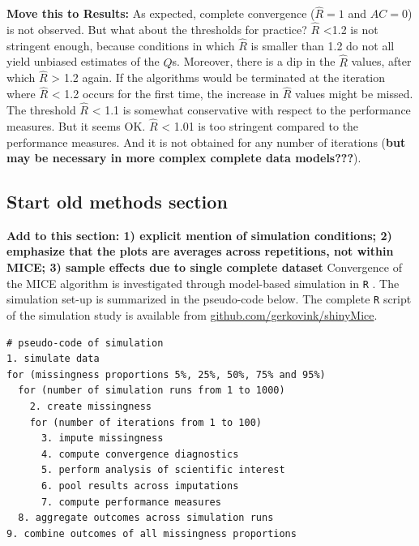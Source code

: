 \documentclass[Royal,times,sageh]{sagej}
\begin{document}
\textbf{Move this to Results:} As expected, complete convergence
(\(\widehat{R}=1\) and \(AC=0\)) is not observed. But what about the
thresholds for practice? \(\widehat{R}\) \textless1.2 is not stringent
enough, because conditions in which \(\widehat{R}\) is smaller than 1.2
do not all yield unbiased estimates of the \(Q\)s. Moreover, there is a
dip in the \(\widehat{R}\) values, after which \(\widehat{R}\)
\textgreater{} 1.2 again. If the algorithms would be terminated at the
iteration where \(\widehat{R}\) \textless{} 1.2 occurs for the first
time, the increase in \(\widehat{R}\) values might be missed. The
threshold \(\widehat{R}\) \textless{} 1.1 is somewhat conservative with
respect to the performance measures. But it seems OK. \(\widehat{R}\)
\textless{} 1.01 is too stringent compared to the performance measures.
And it is not obtained for any number of iterations (\textbf{but may be
necessary in more complex complete data models???}).

\hypertarget{start-old-methods-section}{%
\subsection{Start old methods section}\label{start-old-methods-section}}

\textbf{Add to this section: 1) explicit mention of simulation
conditions; 2) emphasize that the plots are averages across repetitions,
not within MICE; 3) sample effects due to single complete dataset}
Convergence of the MICE algorithm is investigated through model-based
simulation in \texttt{R} \citep[version 3.6.3;][]{R}. The simulation
set-up is summarized in the pseudo-code below. The complete \texttt{R}
script of the simulation study is available from
\href{https://github.com/gerkovink/shinyMice/tree/master/3.Thesis/1.SimulationStudy}{github.com/gerkovink/shinyMice}.

\begin{verbatim}
# pseudo-code of simulation 
1. simulate data 
for (missingness proportions 5%, 25%, 50%, 75% and 95%)
  for (number of simulation runs from 1 to 1000)
    2. create missingness
    for (number of iterations from 1 to 100)
      3. impute missingness
      4. compute convergence diagnostics
      5. perform analysis of scientific interest
      6. pool results across imputations
      7. compute performance measures
  8. aggregate outcomes across simulation runs 
9. combine outcomes of all missingness proportions
\end{verbatim}
\end{document}
